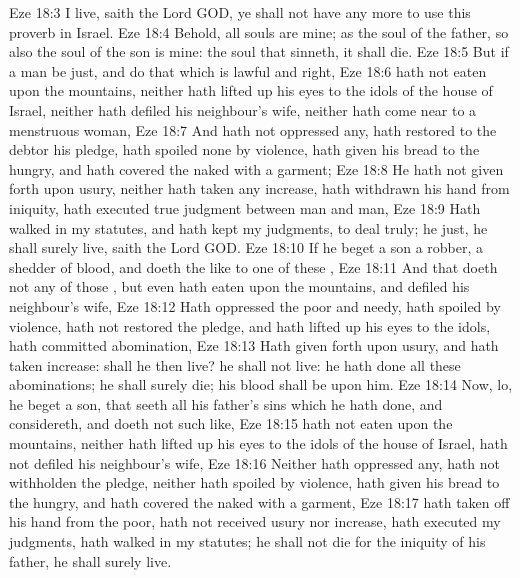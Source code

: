 \vs Eze 18:3  I live, saith the Lord GOD, ye shall not have  any more to use this proverb in Israel.
\vs Eze 18:4 Behold, all souls are mine; as the soul of the father, so also the soul of the son is mine: the soul that sinneth, it shall die.
\vs Eze 18:5 But if a man be just, and do that which is lawful and right,
\vs Eze 18:6  hath not eaten upon the mountains, neither hath lifted up his eyes to the idols of the house of Israel, neither hath defiled his neighbour's wife, neither hath come near to a menstruous woman,
\vs Eze 18:7 And hath not oppressed any,  hath restored to the debtor his pledge, hath spoiled none by violence, hath given his bread to the hungry, and hath covered the naked with a garment;
\vs Eze 18:8 He  hath not given forth upon usury, neither hath taken any increase,  hath withdrawn his hand from iniquity, hath executed true judgment between man and man,
\vs Eze 18:9 Hath walked in my statutes, and hath kept my judgments, to deal truly; he  just, he shall surely live, saith the Lord GOD.
\vs Eze 18:10 If he beget a son  a robber, a shedder of blood, and  doeth the like to  one of these ,
\vs Eze 18:11 And that doeth not any of those , but even hath eaten upon the mountains, and defiled his neighbour's wife,
\vs Eze 18:12 Hath oppressed the poor and needy, hath spoiled by violence, hath not restored the pledge, and hath lifted up his eyes to the idols, hath committed abomination,
\vs Eze 18:13 Hath given forth upon usury, and hath taken increase: shall he then live? he shall not live: he hath done all these abominations; he shall surely die; his blood shall be upon him.
\vs Eze 18:14 Now, lo,  he beget a son, that seeth all his father's sins which he hath done, and considereth, and doeth not such like,
\vs Eze 18:15  hath not eaten upon the mountains, neither hath lifted up his eyes to the idols of the house of Israel, hath not defiled his neighbour's wife,
\vs Eze 18:16 Neither hath oppressed any, hath not withholden the pledge, neither hath spoiled by violence,  hath given his bread to the hungry, and hath covered the naked with a garment,
\vs Eze 18:17  hath taken off his hand from the poor,  hath not received usury nor increase, hath executed my judgments, hath walked in my statutes; he shall not die for the iniquity of his father, he shall surely live.

